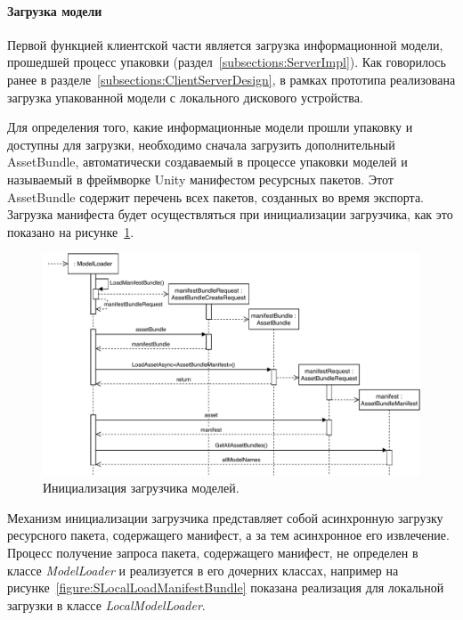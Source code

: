 ﻿\paragraph{Загрузка модели}

Первой функцией клиентской части является загрузка информационной модели,
прошедшей процесс упаковки (раздел~\ref{subsections:ServerImpl}).
Как говорилось ранее в разделе~\ref{subsections:ClientServerDesign},
в рамках прототипа реализована загрузка упакованной модели
с локального дискового устройства.

Для определения того, какие информационные модели прошли упаковку
и доступны для загрузки, необходимо сначала загрузить дополнительный AssetBundle,
автоматически создаваемый в процессе упаковки моделей
и называемый в фреймворке Unity манифестом ресурсных пакетов.
Этот AssetBundle содержит перечень всех пакетов, созданных во время экспорта.%
\cite{DocUnity,UnityAssetsResourcesBundles}
Загрузка манифеста будет осуществляться при инициализации загрузчика,
как это показано на рисунке~\ref{figure:SInitModelLoader}.

\begin{figure}[!htp]
    \centering
    \includegraphics[width=1.0\textwidth]{images/UML-SInitModelLoader.pdf}
    \caption{Инициализация загрузчика моделей.}
    \label{figure:SInitModelLoader}
\end{figure}

Механизм инициализации загрузчика представляет собой асинхронную загрузку
ресурсного пакета, содержащего манифест, а за тем асинхронное его извлечение.
Процесс получение запроса пакета, содержащего манифест, не определен
в классе \emph{ModelLoader} и реализуется в его дочерних классах,
например на рисунке~\ref{figure:SLocalLoadManifestBundle} показана реализация
для локальной загрузки в классе \emph{LocalModelLoader}.

